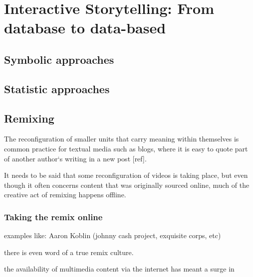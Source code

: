 \chapter{Interactive Storytelling: From database to data-based}
\label{ch:storytelling}
\section{Symbolic approaches}
\label{sec:symbolic}

\cite{Vilmos:2011wv,RodrigoLaiolaGuimaraes:2011tl,Ursu:2009gc}

\section{Statistic approaches}
\label{sec:statistic}

\section{Remixing}

The reconfiguration of smaller units that carry meaning within themselves is common practice for textual media such as blogs, where it is easy to quote part of  another author`s writing in a new post [ref]. 

It needs to be said that some reconfiguration of videos is taking place, but even though it often concerns content that was originally sourced online, much of the creative act of remixing happens offline.


\subsection{Taking the remix online}

examples like: Aaron Koblin (johnny cash project, exquisite corps, etc)

there is even word of a true remix culture.

the availability of multimedia content via the internet has meant a surge in 
